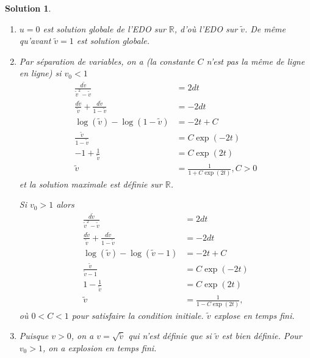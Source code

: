 \documentclass[11pt]{article}
\newcommand{\R}{\ensuremath{\mathbb R}}
\theoremstyle{exostyle}
\newtheorem{solution}{Solution}
\begin{document}
\begin{solution}
\begin{enumerate}
      \item $u = 0$ est solution globale de l’EDO sur $\R$, d’où l’EDO sur $\tilde{v}$. De même qu’avant $\tilde{v}=1$ est solution globale.

          \item 
    Par séparation de variables, on a (la constante $C$ n’est pas la même de ligne en ligne) si $v_0<1$
    \begin{align*}
      \frac{d\tilde{v}}{\tilde{v}^2-\tilde{v}} &= 2dt \\
      \frac{d\tilde{v}}{\tilde{v}} + \frac{d\tilde{v}}{1-\tilde{v}} & = -2dt \\
      \log(\tilde{v}) - \log(1-\tilde{v}) & = -2t + C \\
      \frac{\tilde{v}}{1-\tilde{v}} &=C \exp(-2t) \\
      -1+\frac{1}{\tilde{v}} &=C \exp(2t) \\
      \tilde{v} &= \frac{1}{1+C \exp(2t)}, C>0
    \end{align*}
    et la solution maximale est définie sur $\mathbb{R}$.
    
    Si $v_0>1$ alors 
    \begin{align*}
      \frac{d\tilde{v}}{\tilde{v}^2-\tilde{v}} &= 2dt \\
      \frac{d\tilde{v}}{\tilde{v}} + \frac{d\tilde{v}}{1-\tilde{v}} & = -2dt \\
      \log(\tilde{v}) - \log(\tilde{v}-1) & = -2t + C \\
      \frac{\tilde{v}}{\tilde{v}-1} &=C \exp(-2t) \\
      1-\frac{1}{\tilde{v}} &=C \exp(2t) \\
      \tilde{v} &= \frac{1}{1-C \exp(2t)},
    \end{align*}
    où $0<C<1$ pour satisfaire la condition initiale. $\tilde{v}$ explose en temps fini.
  \item Puisque $v>0$, on a $v = \sqrt{\tilde{v}}$ qui n’est définie que si $\tilde{v}$ est bien définie. Pour $v_0>1$, on a explosion en temps fini.
  \end{enumerate}
\end{solution}
\end{document}
